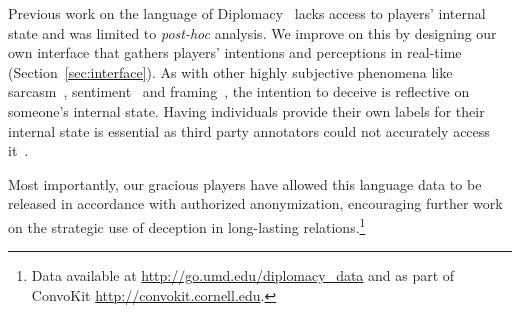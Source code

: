 





Previous work on the language of Diplomacy~\citep{niculaelinguistic}
lacks access to players' internal state and was limited to
\textit{post-hoc} analysis.
%
We improve on this by designing our own interface that gathers
players' intentions and perceptions in real-time
(Section~\ref{sec:interface}).
%
As with other highly subjective phenomena like
sarcasm~\citep{gonzalez-ibanez_identifying_2011,bamman_contextualized_2015},
sentiment~\citep{pang2008opinion} and framing~\citep{greene2009more},
the intention to deceive is reflective on someone's internal state.
%
Having individuals provide their own labels for their internal state
is essential as third party annotators could not accurately access
it~\citep{chang_dont_2020-1}.

Most importantly, our gracious players have allowed this language data
to be released in accordance with  authorized anonymization,
encouraging further work on the strategic use of deception in
long-lasting relations.\footnote{Data available at
  \url{http://go.umd.edu/diplomacy_data} and as part of ConvoKit
  \url{http://convokit.cornell.edu}.}

